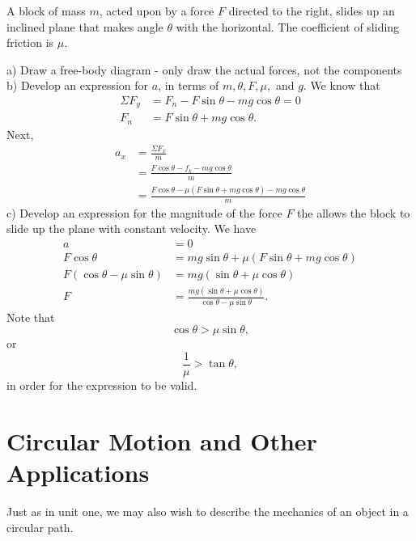 \documentclass[11pt]{article}
\begin{document}
\begin{example}[AP 1981 \#1]
A block of mass $m$, acted upon by a force $F$ directed to the right, slides up an inclined plane that makes angle $\theta$ with the horizontal. The coefficient of sliding friction is $\mu$.
\end{example}
\begin{solution}
	a) Draw a free-body diagram - only draw the actual forces, not the components
	b) Develop an expression for $a$, in terms of $m, \theta, F, \mu,$ and $g$. We know that
	\begin{align*}
		\Sigma F_y &= F_n - F\sin\theta - mg\cos\theta = 0 \\
		F_n &= F\sin\theta + mg\cos\theta.
	\end{align*}
	Next,
	\begin{align*}
		a_x &= \frac{\Sigma F_x}{m} \\
		&= \frac{F\cos\theta - f_k - mg\cos\theta}{m} \\
		&= \frac{F\cos\theta - \mu(F\sin\theta + mg\cos\theta) - mg\cos\theta}{m}
	\end{align*}
	c) Develop an expression for the magnitude of the force $F$ the allows the block to slide up the plane with constant velocity.
	We have
	\begin{align*}
		a &= 0 \\
		F\cos\theta &= mg\sin\theta + \mu(F\sin\theta + mg\cos\theta) \\
		F(\cos\theta - \mu\sin\theta) &= mg(\sin\theta + \mu\cos\theta) \\
		F &= \frac{mg(\sin\theta + \mu\cos\theta)}{\cos\theta - \mu\sin\theta}.
	\end{align*}
	Note that
	\[\cos\theta > \mu\sin\theta,\]
	or
	\[\frac{1}{\mu} > \tan\theta,\]
	in order for the expression to be valid.
\end{solution}

\section{Circular Motion and Other Applications}
Just as in unit one, we may also wish to describe the mechanics of an object in a circular path.
\end{document}
